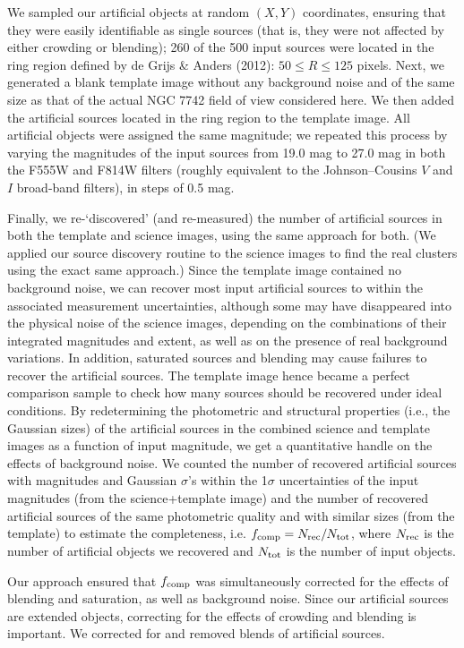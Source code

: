 \documentclass{raa}            %
\begin{document}
We sampled our artificial objects at random $(X, Y)$ coordinates,
ensuring that they were easily identifiable as single sources (that
is, they were not affected by either crowding or blending); 260 of the
500 input sources were located in the ring region defined by de Grijs
\& Anders (2012): $50 \le R \le 125$ pixels. Next, we generated a
blank template image without any background noise and of the same size
as that of the actual NGC 7742 field of view considered here. We then
added the artificial sources located in the ring region to the
template image. All artificial objects were assigned the same
magnitude; we repeated this process by varying the magnitudes of the
input sources from 19.0 mag to 27.0 mag in both the F555W and F814W
filters (roughly equivalent to the Johnson--Cousins $V$ and $I$
broad-band filters), in steps of 0.5 mag.

Finally, we re-`discovered' (and re-measured) the number of artificial
sources in both the template and science images, using the same
approach for both. (We applied our source discovery routine to the
science images to find the real clusters using the exact same
approach.) Since the template image contained no background noise, we
can recover most input artificial sources to within the associated
measurement uncertainties, although some may have disappeared into the
physical noise of the science images, depending on the combinations of
their integrated magnitudes and extent, as well as on the presence of
real background variations. In addition, saturated sources and
blending may cause failures to recover the artificial sources. The
template image hence became a perfect comparison sample to check how
many sources should be recovered under ideal conditions. By
redetermining the photometric and structural properties (i.e., the
Gaussian sizes) of the artificial sources in the combined science and
template images as a function of input magnitude, we get a
quantitative handle on the effects of background noise. We counted the
number of recovered artificial sources with magnitudes and Gaussian
$\sigma$'s within the 1$\sigma$ uncertainties of the input magnitudes
(from the science+template image) and the number of recovered
artificial sources of the same photometric quality and with similar
sizes (from the template) to estimate the completeness, i.e. $f_{\rm
  comp} = N_{\rm rec}/N_{\rm tot}$, where $N_{\rm rec}$ is the number
of artificial objects we recovered and $N_{\rm tot}$ is the number of
input objects.

Our approach ensured that $f_{\rm comp}$ was simultaneously corrected
for the effects of blending and saturation, as well as background
noise. Since our artificial sources are extended objects, correcting
for the effects of crowding and blending is important. We corrected
for and removed blends of artificial sources.
\end{document}
